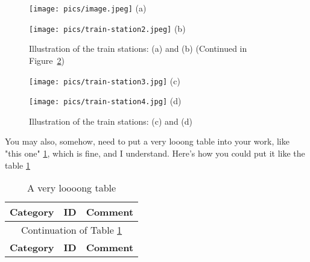 \begin{Chapter}
\begin{figure}[ht]
    \centering
    \begin{minipage}{\linewidth}
        \centering
        \texttt{[image: pics/image.jpeg]}
        \vspace{0.5ex}
        \small (a)
    \end{minipage}
    \vspace{0.5em}
    
    \begin{minipage}{\linewidth}
        \centering
        \texttt{[image: pics/train-station2.jpeg]}
        \vspace{0.5ex}
        \small (b)
    \end{minipage}
    \caption{Illustration of the train stations: (a) and (b) (Continued in Figure~\ref{fig2-cont})}
    \label{fig2}
\end{figure}

\begin{figure}[ht]
    \centering
    \begin{minipage}{\linewidth}
        \centering
        \texttt{[image: pics/train-station3.jpg]}
        \vspace{0.5ex}
        \small (c)
    \end{minipage}
    \vspace{0.5em}
    
    \begin{minipage}{\linewidth}
        \centering
        \texttt{[image: pics/train-station4.jpg]}
        \vspace{0.5ex}
        \small (d)
    \end{minipage}
    \caption{Illustration of the train stations: (c) and (d)}
    \label{fig2-cont}
\end{figure}

You may also, somehow, need to put a very looong table into your work, like "this one" \ref{sec.longtable}, which is fine, and I understand. Here's how you could put it like the table \ref{sec.longtable}

\begin{longtable}{|p{}|p{}|p{}|}
\caption{A very loooong table} \label{sec.longtable}\\
\hline
\textbf{Category}& \textbf{ID}& \multicolumn{1}{|c|}{\textbf{Comment}} \\
\hline
\endfirsthead

\hline
\multicolumn{3}{|c|}{Continuation of Table \ref{sec.longtable}}\\
\hline
\textbf{Category}& \textbf{ID}& \multicolumn{1}{|c|}{\textbf{Comment}} \\
\hline
\endhead


\end{longtable}
\end{Chapter}
